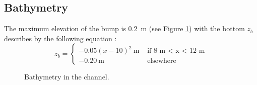 \subsection{Bathymetry}
The maximum elevation of
the bump is 0.2~m (see Figure \ref{t2d:bumpsub:fig:baty}) with
the bottom $z_b$ describes by the following equation :
\begin{equation*}
z_b = \left\{
\begin{array}{rl}
  -0.05(x-10)^2~\text{m}& \text{ if 8 m < x < 12 m} \\
-0.20~\text{m}& \text{ elsewhere}
\end{array}
\right.
\end{equation*}

\begin{figure}[H]
 \centering
 \caption{Bathymetry in the channel.}
 \label{t2d:bumpsub:fig:baty}
\end{figure}


